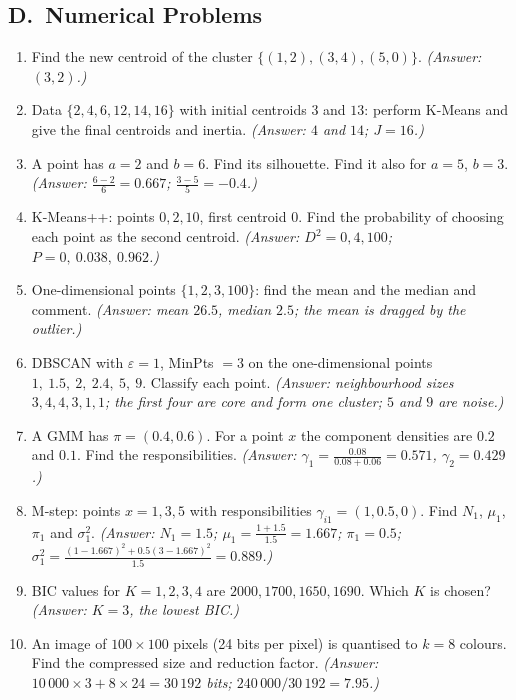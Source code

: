 \subsection*{D.\ Numerical Problems}
\begin{enumerate}
  \item Find the new centroid of the cluster $\{(1,2),(3,4),(5,0)\}$. \textit{(Answer: $(3,2)$.)}
  \item Data $\{2,4,6,12,14,16\}$ with initial centroids $3$ and $13$: perform K-Means and give the final centroids and inertia. \textit{(Answer: $4$ and $14$; $J=16$.)}
  \item A point has $a=2$ and $b=6$. Find its silhouette. Find it also for $a=5$, $b=3$. \textit{(Answer: $\frac{6-2}6=0.667$; $\frac{3-5}5=-0.4$.)}
  \item K-Means++: points $0,2,10$, first centroid $0$. Find the probability of choosing each point as the second centroid. \textit{(Answer: $D^2=0,4,100$; $P=0,\ 0.038,\ 0.962$.)}
  \item One-dimensional points $\{1,2,3,100\}$: find the mean and the median and comment. \textit{(Answer: mean $26.5$, median $2.5$; the mean is dragged by the outlier.)}
  \item DBSCAN with $\varepsilon=1$, MinPts $=3$ on the one-dimensional points $1,\ 1.5,\ 2,\ 2.4,\ 5,\ 9$. Classify each point. \textit{(Answer: neighbourhood sizes $3,4,4,3,1,1$; the first four are core and form one cluster; $5$ and $9$ are noise.)}
  \item A GMM has $\pi=(0.4,0.6)$. For a point $x$ the component densities are $0.2$ and $0.1$. Find the responsibilities. \textit{(Answer: $\gamma_1=\frac{0.08}{0.08+0.06}=0.571$, $\gamma_2=0.429$.)}
  \item M-step: points $x=1,3,5$ with responsibilities $\gamma_{i1}=(1,0.5,0)$. Find $N_1$, $\mu_1$, $\pi_1$ and $\sigma_1^2$. \textit{(Answer: $N_1=1.5$; $\mu_1=\frac{1+1.5}{1.5}=1.667$; $\pi_1=0.5$; $\sigma_1^2=\frac{(1-1.667)^2+0.5(3-1.667)^2}{1.5}=0.889$.)}
  \item BIC values for $K=1,2,3,4$ are $2000,1700,1650,1690$. Which $K$ is chosen? \textit{(Answer: $K=3$, the lowest BIC.)}
  \item An image of $100\times100$ pixels (24 bits per pixel) is quantised to $k=8$ colours. Find the compressed size and reduction factor. \textit{(Answer: $10\,000\times3+8\times24=30\,192$ bits; $240\,000/30\,192=7.95$.)}
\end{enumerate}

